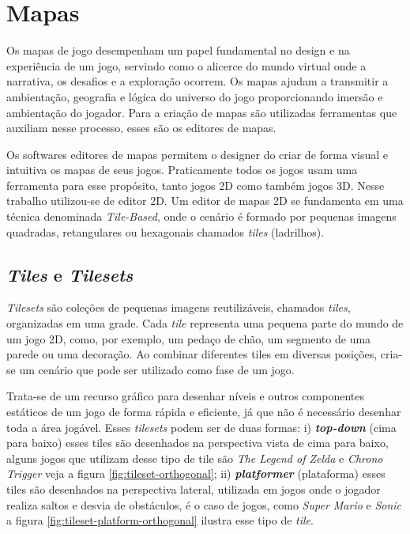 \section{Mapas}
\label{sec-mapas}

Os mapas de jogo desempenham um papel fundamental no design e na experiência de um jogo, servindo como o alicerce do mundo virtual onde a narrativa, os desafios e a exploração ocorrem. Os mapas ajudam a transmitir a ambientação, geografia e lógica do universo do jogo proporcionando imersão e ambientação do jogador. Para a criação de mapas são utilizadas ferramentas que auxiliam nesse processo, esses são os editores de mapas.

 Os softwares editores de mapas permitem o designer do criar de forma visual e intuitiva os mapas de seus jogos. Praticamente todos os jogos usam uma ferramenta para esse propósito, tanto jogos 2D como também jogos 3D. Nesse trabalho  utilizou-se de editor 2D. Um editor de mapas 2D se fundamenta em uma técnica denominada \textit{Tile-Based}, onde o cenário é formado por pequenas imagens quadradas, retangulares ou hexagonais chamados \textit{tiles} (ladrilhos).

\subsection{\textit{Tiles} e \textit{Tilesets}}
\label{sec:tiles-e-tilesets}
\textit{Tilesets} são coleções de pequenas imagens reutilizáveis, chamados \textit{tiles}, organizadas em uma grade. Cada \textit{tile} representa uma pequena parte do mundo de um jogo 2D, como, por exemplo, um pedaço de chão, um segmento de uma parede ou uma decoração. Ao combinar diferentes tiles em diversas posições, cria-se um cenário que pode ser utilizado como fase de um jogo. 

Trata-se de um recurso gráfico para desenhar níveis e outros componentes estáticos de um jogo de forma rápida e eficiente, já que não é necessário desenhar toda a área jogável. Esses \textit{tilesets} podem ser de duas formas: i) \textit{\textbf{top-down}} (cima para baixo) esses tiles são desenhados na perspectiva vista de cima para baixo, alguns jogos que utilizam desse tipo de tile são \textit{The Legend of Zelda} e \textit{Chrono Trigger} veja a figura \ref{fig:tileset-orthogonal}; ii) \textit{\textbf{platformer}} (plataforma) esses tiles são desenhados na perspectiva lateral, utilizada em jogos onde o jogador realiza saltos e desvia de obstáculos, é o caso de jogos, como \textit{Super Mario} e \textit{Sonic} a figura \ref{fig:tileset-platform-orthogonal} ilustra esse tipo de \textit{tile}.


